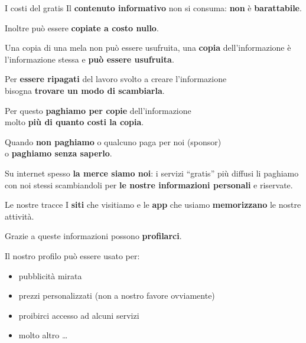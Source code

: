 \begin{myframe}{I costi del gratis}
  Il \textbf{contenuto informativo} non si consuma: \textbf{non} è \textbf{barattabile}.

  Inoltre può essere \textbf{copiate a costo nullo}.

  \medskip\pause
  Una copia di una mela non può essere usufruita, una \textbf{copia} dell'informazione è l'informazione stessa e \textbf{può essere usufruita}.

  \pause
  Per \textbf{essere ripagati} del lavoro svolto a creare l'informazione\\bisogna \textbf{trovare un modo di scambiarla}.

  Per questo \textbf{paghiamo per copie} dell'informazione\\molto \textbf{più di quanto costi la copia}.

  \medskip\pause
  Quando \textbf{non paghiamo} o qualcuno paga per noi (sponsor)\\o \textbf{paghiamo senza saperlo}.

  Su internet spesso \textbf{la merce siamo noi}: i servizi ``gratis'' più diffusi li paghiamo con noi stessi scambiandoli per \textbf{le nostre informazioni personali} e riservate.
\end{myframe}

\begin{myframe}{Le nostre tracce}
  I \textbf{siti} che visitiamo e le \textbf{app} che usiamo \textbf{memorizzano} le nostre attività.

  \pause\medskip
  Grazie a queste informazioni possono \textbf{profilarci}.

  \pause\medskip
  Il nostro profilo può essere usato per:
  \begin{itemize}[<+->]
    \item pubblicità mirata
    \item prezzi personalizzati (non a nostro favore ovviamente)
    \item proibirci accesso ad alcuni servizi
    \item molto altro \dots
  \end{itemize}

\end{myframe}

